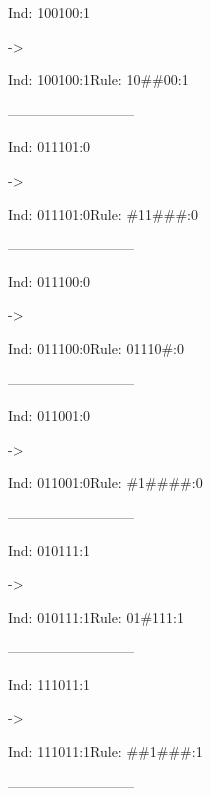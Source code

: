 \documentclass[12pt,openright,twoside,letterpaper,english,brazil,sumario=tradicional]{abntex2}
\begin{document}
\begin{flushleft}\ttfamily
\par Ind: 100100:1\end{flushleft} -> \begin{flushleft}\ttfamily
\par Ind: 100100:1Rule: \textcolor[cmy]{0.15013,0.0820292,0.415475,}{10\#\#00:1}
\end{flushleft}---------------------------

\begin{flushleft}\ttfamily
\par Ind: 011101:0\end{flushleft} -> \begin{flushleft}\ttfamily
\par Ind: 011101:0Rule: \textcolor[cmy]{0.921296,0.23939,0.828805,}{\#11\#\#\#:0}
\end{flushleft}---------------------------

\begin{flushleft}\ttfamily
\par Ind: 011100:0\end{flushleft} -> \begin{flushleft}\ttfamily
\par Ind: 011100:0Rule: \textcolor[cmy]{0.912663,0.990557,0.832037,}{01110\#:0}
\end{flushleft}---------------------------

\begin{flushleft}\ttfamily
\par Ind: 011001:0\end{flushleft} -> \begin{flushleft}\ttfamily
\par Ind: 011001:0Rule: \textcolor[cmy]{0.860186,0.0557536,0.572045,}{\#1\#\#\#\#:0}
\end{flushleft}---------------------------

\begin{flushleft}\ttfamily
\par Ind: 010111:1\end{flushleft} -> \begin{flushleft}\ttfamily
\par Ind: 010111:1Rule: \textcolor[cmy]{0.77476,0.877768,0.107538,}{01\#111:1}
\end{flushleft}---------------------------

\begin{flushleft}\ttfamily
\par Ind: 111011:1\end{flushleft} -> \begin{flushleft}\ttfamily
\par Ind: 111011:1Rule: \textcolor[cmy]{0.148769,0.659432,0.0836686,}{\#\#1\#\#\#:1}
\end{flushleft}---------------------------
\end{document}
